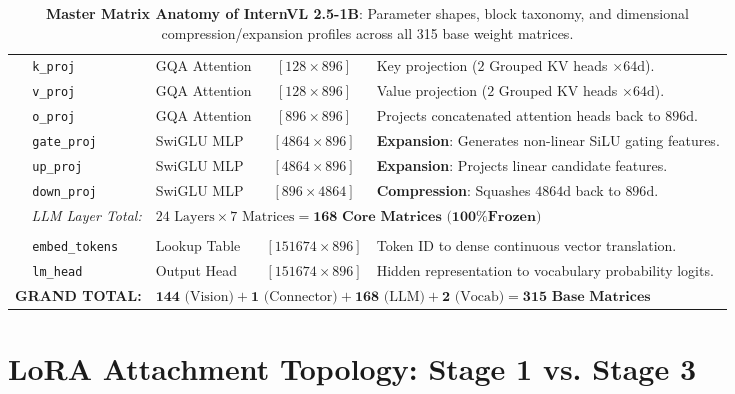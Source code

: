 \documentclass[11pt, a4paper]{article}
\begin{document}
\begin{table}[htbp]
\begin{tabularx}{\textwidth}{l l l c X}
& \texttt{k\_proj} & GQA Attention & $[128 \times 896]$ & Key projection ($2$ Grouped KV heads $\times 64\text{d}$). \\
& \texttt{v\_proj} & GQA Attention & $[128 \times 896]$ & Value projection ($2$ Grouped KV heads $\times 64\text{d}$). \\
& \texttt{o\_proj} & GQA Attention & $[896 \times 896]$ & Projects concatenated attention heads back to $896\text{d}$. \\
& \texttt{gate\_proj} & SwiGLU MLP & $[4864 \times 896]$ & \textbf{Expansion}: Generates non-linear SiLU gating features. \\
& \texttt{up\_proj} & SwiGLU MLP & $[4864 \times 896]$ & \textbf{Expansion}: Projects linear candidate features. \\
& \texttt{down\_proj} & SwiGLU MLP & $[896 \times 4864]$ & \textbf{Compression}: Squashes $4864\text{d}$ back to $896\text{d}$. \\
\multicolumn{2}{r}{\textit{LLM Layer Total:}} & \multicolumn{3}{l}{$24 \text{ Layers} \times 7 \text{ Matrices} = \mathbf{168\text{ Core Matrices (100\% Frozen)}}$} \\
\midrule
\rowcolor{gray!10} \multicolumn{5}{l}{\textbf{4. Vocabulary Boundary Matrices}} \\
& \texttt{embed\_tokens} & Lookup Table & $[151674 \times 896]$ & Token ID to dense continuous vector translation. \\
& \texttt{lm\_head} & Output Head & $[151674 \times 896]$ & Hidden representation to vocabulary probability logits. \\
\midrule
\multicolumn{2}{r}{\textbf{GRAND TOTAL:}} & \multicolumn{3}{l}{$\mathbf{144} \text{ (Vision)} + \mathbf{1} \text{ (Connector)} + \mathbf{168} \text{ (LLM)} + \mathbf{2} \text{ (Vocab)} = \mathbf{315\text{ Base Matrices}}$} \\
\bottomrule
\end{tabularx}
\caption{\textbf{Master Matrix Anatomy of InternVL 2.5-1B}: Parameter shapes, block taxonomy, and dimensional compression/expansion profiles across all 315 base weight matrices.}
\label{tab:matrix_anatomy}
\end{table}

\section{LoRA Attachment Topology: Stage 1 vs. Stage 3}
\end{document}
